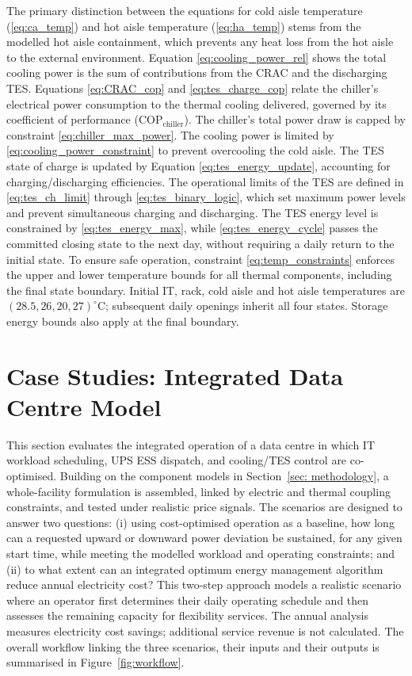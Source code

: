 \documentclass[lettersize,journal]{IEEEtran}
\newcommand{\rev}[1]{#1}
\begin{document}
The primary distinction between the equations for cold aisle temperature (\ref{eq:ca_temp}) and hot aisle temperature (\ref{eq:ha_temp}) stems from the modelled hot aisle containment, which prevents any heat loss from the hot aisle to the external environment. Equation \eqref{eq:cooling_power_rel} shows the total cooling power is the sum of contributions from the CRAC and the discharging TES. Equations \eqref{eq:CRAC_cop} and \eqref{eq:tes_charge_cop} relate the chiller's electrical power consumption to the thermal cooling delivered, governed by its coefficient of performance ($\mathrm{COP}_{\mathrm{chiller}}$). The chiller's total power draw is capped by constraint \eqref{eq:chiller_max_power}. The cooling power is limited by \eqref{eq:cooling_power_constraint} to prevent overcooling the cold aisle. The TES state of charge is updated by Equation \eqref{eq:tes_energy_update}, accounting for charging/discharging efficiencies. The operational limits of the TES are defined in \eqref{eq:tes_ch_limit} through \eqref{eq:tes_binary_logic}, which set maximum power levels and prevent simultaneous charging and discharging. The TES energy level is constrained by \eqref{eq:tes_energy_max}, while \eqref{eq:tes_energy_cycle} passes the committed closing state to the next day, without requiring a daily return to the initial state.
To ensure safe operation, constraint \eqref{eq:temp_constraints} enforces the upper and lower temperature bounds for all thermal components, including the final state boundary. Initial IT, rack, cold aisle and hot aisle temperatures are $(28.5,26,20,27)^\circ$C; subsequent daily openings inherit all four states. Storage energy bounds also apply at the final boundary.
 

\section{Case Studies: Integrated Data Centre Model}\label{sec:integrated_model and case studies}

This section evaluates the integrated operation of a data centre in which IT workload scheduling, UPS ESS dispatch, and cooling/TES control are co-optimised. Building on the component models in Section~\ref{sec: methodology}, a whole-facility formulation is assembled, linked by electric and thermal coupling constraints, and tested under realistic price signals. The scenarios are designed to answer two questions: (i) using cost-optimised operation as a baseline, how long can a requested upward or downward power deviation be sustained, for any given start time, while meeting the modelled workload and operating constraints; and (ii) to what extent can an integrated optimum energy management algorithm reduce annual electricity cost? This two-step approach models a realistic scenario where an operator first determines their daily operating schedule and then assesses the remaining capacity for flexibility services. The annual analysis measures electricity cost savings; additional service revenue is not calculated. \rev{The overall workflow linking the three scenarios, their inputs and their outputs is summarised in Figure~\ref{fig:workflow}.}
\end{document}
